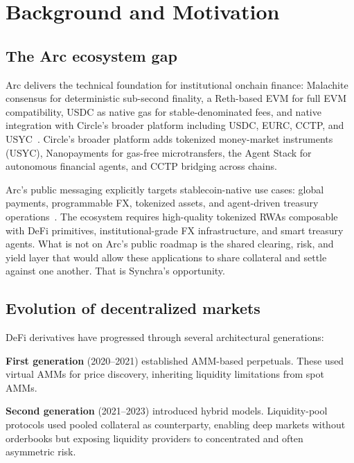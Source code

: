 \documentclass[11pt,a4paper]{article}
\begin{document}
\section{Background and Motivation}
\label{sec:background}

\subsection{The Arc ecosystem gap}

Arc delivers the technical foundation for institutional onchain finance: Malachite consensus for deterministic sub-second finality, a Reth-based EVM for full EVM compatibility, USDC as native gas for stable-denominated fees, and native integration with Circle's broader platform including USDC, EURC, CCTP, and USYC~\cite{circlearc, arc_technical}. Circle's broader platform adds tokenized money-market instruments (USYC), Nanopayments for gas-free microtransfers, the Agent Stack for autonomous financial agents, and CCTP bridging across chains.

Arc's public messaging explicitly targets stablecoin-native use cases: global payments, programmable FX, tokenized assets, and agent-driven treasury operations~\cite{circlearc}. The ecosystem requires high-quality tokenized RWAs composable with DeFi primitives, institutional-grade FX infrastructure, and smart treasury agents. What is not on Arc's public roadmap is the shared clearing, risk, and yield layer that would allow these applications to share collateral and settle against one another. That is Synchra's opportunity.

\subsection{Evolution of decentralized markets}

DeFi derivatives have progressed through several architectural generations:

\textbf{First generation} (2020--2021) established AMM-based perpetuals. These used virtual AMMs for price discovery, inheriting liquidity limitations from spot AMMs.

\textbf{Second generation} (2021--2023) introduced hybrid models. Liquidity-pool protocols used pooled collateral as counterparty, enabling deep markets without orderbooks but exposing liquidity providers to concentrated and often asymmetric risk.
\end{document}
